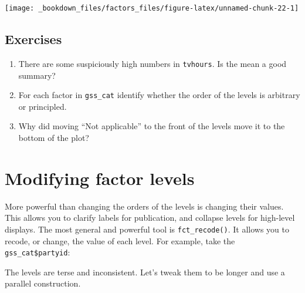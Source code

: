 \documentclass[]{book}
\newenvironment{Shaded}{\begin{snugshade}}{\end{snugshade}}
\newcommand{\KeywordTok}[1]{\textcolor[rgb]{0.13,0.29,0.53}{\textbf{{#1}}}}
\newcommand{\StringTok}[1]{\textcolor[rgb]{0.31,0.60,0.02}{{#1}}}
\newcommand{\CommentTok}[1]{\textcolor[rgb]{0.56,0.35,0.01}{\textit{{#1}}}}
\newcommand{\NormalTok}[1]{{#1}}
\begin{document}
\begin{center}\texttt{[image: \_bookdown\_files/factors\_files/figure-latex/unnamed-chunk-22-1]} \end{center}

\subsection{Exercises}\label{exercises-43}

\begin{enumerate}
\def\labelenumi{\arabic{enumi}.}
\item
  There are some suspiciously high numbers in \texttt{tvhours}. Is the
  mean a good summary?
\item
  For each factor in \texttt{gss\_cat} identify whether the order of the
  levels is arbitrary or principled.
\item
  Why did moving ``Not applicable'' to the front of the levels move it
  to the bottom of the plot?
\end{enumerate}

\section{Modifying factor levels}\label{modifying-factor-levels}

More powerful than changing the orders of the levels is changing their
values. This allows you to clarify labels for publication, and collapse
levels for high-level displays. The most general and powerful tool is
\texttt{fct\_recode()}. It allows you to recode, or change, the value of
each level. For example, take the \texttt{gss\_cat\$partyid}:

\begin{Shaded}
\end{Shaded}

The levels are terse and inconsistent. Let's tweak them to be longer and
use a parallel construction.
\end{document}
